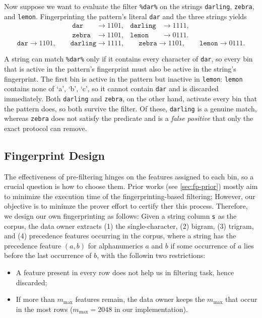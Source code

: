 Now suppose we want to evaluate the filter \texttt{\%dar\%} on the strings \texttt{darling}, \texttt{zebra}, and \texttt{lemon}. Fingerprinting the pattern's literal \texttt{dar} and the three strings yields
\ifsp
\begin{align*}
 \texttt{dar} &\to 1101, & \texttt{darling} &\to 1111,\\
 \texttt{zebra} &\to 1101, & \texttt{lemon} &\to 0111.
\end{align*}
\else
\begin{equation*}
 \texttt{dar}\to 1101,\qquad \texttt{darling} \to 1111,\qquad \texttt{zebra} \to 1101,\qquad \texttt{lemon}\to 0111.
\end{equation*}
\fi

A string can match \texttt{\%dar\%} only if it contains every character of \texttt{dar}, so every bin that is active in the pattern's fingerprint must also be active in the string's fingerprint. The first bin is active in the pattern but inactive in \texttt{lemon}: \texttt{lemon} contains none of `a', `b', `c', so it cannot contain \texttt{dar} and is discarded immediately. Both \texttt{darling} and \texttt{zebra}, on the other hand, activate every bin that the pattern does, so both survive the filter. Of these, \texttt{darling} is a genuine match, whereas \texttt{zebra} does not satisfy the predicate and is a \emph{false positive} that only the exact protocol can remove.

\subsection{Fingerprint Design}
\label{sec:fp-design}
The effectiveness of pre-filtering hinges on the features assigned to each bin, so a crucial question is how to choose them. Prior works (see \cref{sec:fp-prior}) mostly aim to minimize the execution time of the fingerprinting-based filtering; However, our objective is to minimze the prover effort to certify ther this process. Therefore, we design our own fingerprinting as follows: Given a string column $\mathsf{s}$ as the corpus, the data owner extracts (1) the single-character, (2) bigram, (3) trigram, and (4) precedence features occurring in the corpus, where a string has the precedence feature $(a, b)$ for alphanumerics $a$ and $b$ if some occurrence of $a$ lies before the last occurrence of $b$, with the followin two restrictions:
\begin{itemize}[nosep]
  \item  A feature present in every row does not help us in filtering task, hence discarded;
\item If more than $m_{\max}$ features remain, the data owner keeps the $m_{\max}$ that occur in the most rows ($m_{\max} = 2048$ in our implementation).
\end{itemize}

